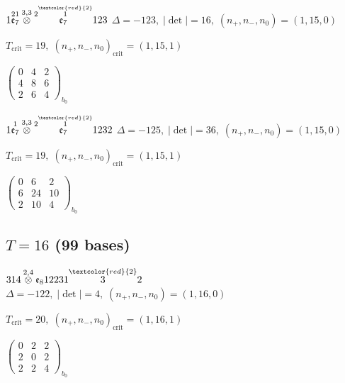 \documentclass[10pt]{article}
\begin{document}
$1\overset{21}{\mathfrak{e}_7}\overset{3,3}{\otimes}\overset{2\overset{\textcolor{red}{2}}{1}}{\mathfrak{e}_7}123$ \quad $\Delta=-123,\; |\det|=16,\; (n_+,n_-,n_0)=(1,15,0)$

\hspace{1em}$T_{\text{crit}}=19,\; (n_+,n_-,n_0)_{\text{crit}}=(1,15,1)$

\hspace{2em}$\left(\begin{smallmatrix}0 & 4 & 2 \\ 4 & 8 & 6 \\ 2 & 6 & 4\end{smallmatrix}\right)_{\!b_0}$

\smallskip

$1\overset{1}{\mathfrak{e}_7}\overset{3,3}{\otimes}\overset{2\overset{\textcolor{red}{2}}{1}}{\mathfrak{e}_7}1232$ \quad $\Delta=-125,\; |\det|=36,\; (n_+,n_-,n_0)=(1,15,0)$

\hspace{1em}$T_{\text{crit}}=19,\; (n_+,n_-,n_0)_{\text{crit}}=(1,15,1)$

\hspace{2em}$\left(\begin{smallmatrix}0 & 6 & 2 \\ 6 & 24 & 10 \\ 2 & 10 & 4\end{smallmatrix}\right)_{\!b_0}$


\subsection*{$T = 16$ \quad (99 bases)}
\smallskip

$314\overset{2,4}{\otimes}\mathfrak{e}_812231\overset{\textcolor{red}{2}}{3}2$ \quad $\Delta=-122,\; |\det|=4,\; (n_+,n_-,n_0)=(1,16,0)$

\hspace{1em}$T_{\text{crit}}=20,\; (n_+,n_-,n_0)_{\text{crit}}=(1,16,1)$

\hspace{2em}$\left(\begin{smallmatrix}0 & 2 & 2 \\ 2 & 0 & 2 \\ 2 & 2 & 4\end{smallmatrix}\right)_{\!b_0}$
\end{document}
